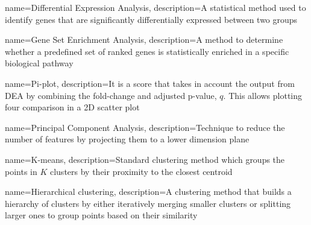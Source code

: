 
{
    name=Differential Expression Analysis,
    description={A statistical method used to identify genes that are significantly differentially expressed between two groups}
}

{
    name=Gene Set Enrichment Analysis,
    description={A method to determine whether a predefined set of ranked genes is statistically enriched in a specific biological pathway}
}

{
    name=Pi-plot,
    description={It is a score that takes in account the output from DEA by combining the fold-change and adjusted p-value, $q$. This allows plotting four comparison in a 2D scatter plot}
}


{
    name=Principal Component Analysis,
    description={Technique to reduce the number of features by projecting them to a lower dimension plane}
}

{
    name=K-means,
    description={Standard clustering method which groups the points in $K$ clusters by their proximity to the closest centroid}
}

{
    name=Hierarchical clustering,
    description={A clustering method that builds a hierarchy of clusters by either iteratively merging smaller clusters or splitting larger ones to group points based on their similarity}
}
